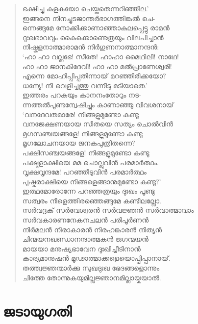 \begin{verse}
ഭക്ഷിച്ചു കളകയോ ചെയ്തതെന്നറിഞ്ഞീല.’\\
ഇങ്ങനെ നിനച്ചുടജാന്തര്‍ഭാഗത്തിങ്കല്‍ ചെ-\\
ന്നെങ്ങുമേ നോക്കിക്കാണാഞ്ഞാകുലപ്പെട്ടു രാമന്‍\\
ദുഃഖഭാവവും കൈക്കൊണ്ടെത്രയും വിലപിച്ചാന്‍\\
നിഷ്കളനാത്മാരാമന്‍ നിര്‍ഗുണനാത്മാനന്ദന്‍:\\
‘ഹാ ഹാ വല്ലഭേ! സീതേ! ഹാഹാ മൈഥിലീ! നാഥേ!\\
ഹാ ഹാ ജാനകീദേവീ! ഹാ ഹാ മല്‍പ്രാണേശ്വരീ!\\
എന്നെ മോഹിപ്പിപ്പതിന്നായ് മറഞ്ഞിരിക്കയോ?\\
ധന്യേ! നീ വെളിച്ചത്തു വന്നീടു മടിയാതെ.’\\
ഇത്തരം പറകയും കാനനംതോറും നട-\\
ന്നത്തല്‍പൂണ്ടന്വേഷിച്ചും കാണാഞ്ഞു വിവശനായ്\\
‘വനദേവതമാരേ! നിങ്ങളുമുണ്ടോ കണ്ടൂ\\
വനജേക്ഷണയായ സീതയെ സത്യം ചൊല്‍വിന്‍\\
മൃഗസഞ്ചയങ്ങളേ! നിങ്ങളുമുണ്ടോ കണ്ടു\\
മൃഗലോചനയായ ജനകപുത്രിതന്നെ?\\
പക്ഷിസഞ്ചയങ്ങളേ! നിങ്ങളുമുണ്ടോ കണ്ടു\\
പക്ഷ്മളാക്ഷിയെ മമ ചൊല്ലുവിന്‍ പരമാര്‍ത്ഥം.\\
വൃക്ഷവൃന്ദമേ! പറഞ്ഞീടുവിന്‍ പരമാര്‍ത്ഥം\\
പുഷ്കരാക്ഷിയെ നിങ്ങളെങ്ങാനുമുണ്ടോ കണ്ടൂ?’\\
ഇത്ഥമോരോന്നേ പറഞ്ഞത്രയും ദുഃഖം പൂണ്ടു\\
സത്വരം നീളെത്തിരഞ്ഞെങ്ങുമേ കണ്ടീലല്ലോ.\\
സര്‍വദൃക് സര്‍വേശ്വരന്‍ സര്‍വജ്ഞന്‍ സര്‍വാത്മാവാം\\
സര്‍വകാരണനേകനചലന്‍ പരിപൂര്‍ണന്‍\\
നിര്‍മലന്‍ നിരാകാരന്‍ നിരഹങ്കാരന്‍ നിത്യന്‍\\
ചിന്മയനഖണ്ഡാനന്ദാത്മകന്‍ ജഗന്മയന്‍\\
മായയാ മനുഷ്യഭാവേന ദുഃഖിച്ചീടിനാന്‍\\
കാര്യമാനുഷന്‍ മൂഢാത്മാക്കളെയൊപ്പിപ്പാനായ്.\\
തത്ത്വജ്ഞന്മാര്‍ക്കു സുഖദുഃഖ ഭേദങ്ങളൊന്നും\\
ചിത്തേ തോന്നുകയുമില്ലജ്ഞാനമില്ലായ്കയാല്‍.
\end{verse}

\section{ജടായുഗതി}

